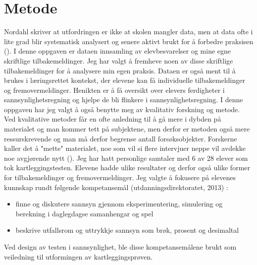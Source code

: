 \documentclass[main.tex]{subfiles}
\begin{document}
\section*{Metode}
\label{sec:2}
Nordahl skriver at utfordringen er ikke at skolen mangler data, men at data ofte i lite grad blir
systematisk analysert og senere aktivt brukt for å forbedre praksisen ().
I denne oppgaven er dataen innsamling av elevbesvarelser og mine egne skriftlige tilbakemeldinger.
Jeg har valgt å fremheve noen av disse skriftlige tilbakemeldinger for å analysere min egen praksis.
Dataen er også ment til å brukes i læringsrettet kontekst, der elevene kan få
individuelle tilbakemeldinger og fremovermeldinger. Henikten er å få oversikt over elevers 
ferdigheter i sannsynlighetsregning og hjelpe de bli flinkere i sannsynlighetsregning.
\newline
\newline
I denne oppgaven har jeg valgt å også benytte meg av kvalitativ forskning og metode. Ved
kvalitative metoder får en ofte anledning til å gå mere i dybden på materialet og man kommer
tett på subjektene, men derfor er metoden også mere ressurskrevende og man må derfor
begrense antall forsøksobjekter. Forskerne kaller det å "mette" materialet, noe som vil si 
flere intervjuer neppe vil avdekke noe avgjørende nytt (). Jeg har hatt
personlige samtaler med 6 av 28 elever som tok kartleggingstesten. Elevene hadde ulike
resultater og derfor også ulike former for tilbakemeldinger og fremovermeldinger.
\newline
\newline
Jeg valgte å fokusere på elevenes kunnskap rundt følgende kompetansemål (utdanningsdirektoratet, 2013) :
\begin{itemize}
\item finne og diskutere sannsyn gjennom eksperimentering, simulering og berekning i daglegdagse samanhengar og spel
\item beskrive utfallsrom og uttrykkje sannsyn som brøk, prosent og desimaltal
\end{itemize}
Ved design av testen i sannsynlighet, ble disse kompetansemålene brukt som veiledning til
utformingen av kartleggingsprøven.
\end{document}
